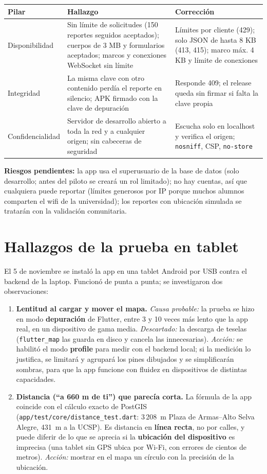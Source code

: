 \documentclass[10pt,a4paper]{article}
\newcommand{\ruta}[1]{\texttt{\footnotesize #1}}
\begin{document}
{\footnotesize
\begin{tabular}{@{}p{2.4cm}p{7.2cm}p{6.9cm}@{}}
\toprule
\textbf{Pilar} & \textbf{Hallazgo} & \textbf{Corrección}\\
\midrule
Disponibilidad & Sin límite de solicitudes (150 reportes seguidos aceptados); cuerpos de 3 MB y formularios aceptados; marcos y conexiones WebSocket sin límite & Límites por cliente (429); solo JSON de hasta 8 KB (413, 415); marco máx. 4 KB y límite de conexiones\\
Integridad & La misma clave con otro contenido perdía el reporte en silencio; APK firmado con la clave de depuración & Responde 409; el release queda sin firmar si falta la clave propia\\
Confidencialidad & Servidor de desarrollo abierto a toda la red y a cualquier origen; sin cabeceras de seguridad & Escucha solo en localhost y verifica el origen; \texttt{nosniff}, CSP, \texttt{no-store}\\
\bottomrule
\end{tabular}}

\textbf{Riesgos pendientes:} la app usa el superusuario de la base de datos (solo desarrollo; antes del piloto se creará un rol limitado); no hay cuentas, así que cualquiera puede reportar (límites generosos por IP porque muchos alumnos comparten el wifi de la universidad); los reportes con ubicación simulada se tratarán con la validación comunitaria.

\section{Hallazgos de la prueba en tablet}
El 5 de noviembre se instaló la app en una tablet Android por USB contra el backend de la laptop. Funcionó de punta a punta; se investigaron dos observaciones:
\begin{enumerate}
  \item \textbf{Lentitud al cargar y mover el mapa.} \emph{Causa probable:} la prueba se hizo en modo \textbf{depuración} de Flutter, entre 3 y 10 veces más lento que la app real, en un dispositivo de gama media. \emph{Descartado:} la descarga de teselas (\texttt{flutter\_map} las guarda en disco y cancela las innecesarias). \emph{Acción:} se habilitó el modo \textbf{profile} para medir con el backend local; si la medición lo justifica, se limitará y agrupará los pines dibujados y se simplificarán sombras, para que la app funcione con fluidez en dispositivos de distintas capacidades.
  \item \textbf{Distancia (``a 660 m de ti'') que parecía corta.} La fórmula de la app coincide con el cálculo exacto de PostGIS (\ruta{app/test/core/distance\_test.dart}: 3\,208~m Plaza de Armas--Alto Selva Alegre, 431~m a la UCSP). Es distancia en \textbf{línea recta}, no por calles, y puede diferir de lo que se aprecia si la \textbf{ubicación del dispositivo} es imprecisa (una tablet sin GPS ubica por Wi-Fi, con errores de cientos de metros). \emph{Acción:} mostrar en el mapa un círculo con la precisión de la ubicación.
\end{enumerate}
\end{document}
